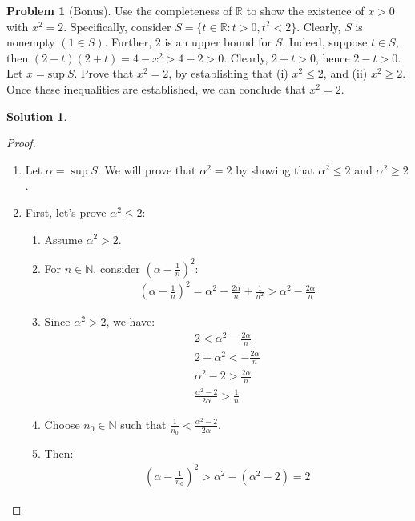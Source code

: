 \documentclass[12pt]{article}
\theoremstyle{definition} %
\newtheorem{solution}{Solution}
\newtheorem{problem}{Problem}
\theoremstyle{plain} %
\begin{document}
  \begin{problem}[Bonus]
      Use the completeness of $\mathbb{R}$ to show the existence of $x>0$ with $x^2=2$. Specifically, consider $S=\{t\in \mathbb{R} : t>0, t^2<2\}$. Clearly, $S$ is nonempty $(1\in S)$. Further, $2$ is an upper bound for $S$. Indeed, suppose $t\in S$, then $(2-t)(2+t)=4-x^2>4-2>0$. Clearly, $2+t>0$, hence $2-t>0$. 
  Let $x=\text{sup} \ S$. Prove that $x^2=2$, by establishing that (i) $x^2\leq 2$, and (ii) $x^2\geq 2$. Once these inequalities are established, we can conclude that $x^2=2$.
  
  \end{problem}
  \begin{solution}
      \begin{proof}
          \begin{enumerate}
              \item Let $\alpha = \sup S$. We will prove that $\alpha^2 = 2$ by showing that $\alpha^2 \leq 2$ and $\alpha^2 \geq 2$.
              \item First, let's prove $\alpha^2 \leq 2$:
              \begin{enumerate}
                  \item Assume $\alpha^2 > 2$.
                  \item For $n \in \mathbb{N}$, consider $(\alpha - \frac{1}{n})^2$:
                  \begin{align}
                  \left( \alpha-\frac{1}{n} \right)^2=\alpha^2-\frac{2\alpha}{n}+\frac{1}{n^2}>\alpha^2-\frac{2\alpha}{n}
                  \end{align}
                  \item Since $\alpha^2 > 2$, we have:
                  \begin{align}
                  2<\alpha^2-\frac{2\alpha}{n} \\
                  2-\alpha^2<-\frac{2\alpha}{n} \\
                  \alpha^2-2> \frac{2\alpha}{n} \\
                  \frac{\alpha^2-2}{2\alpha}> \frac{1}{n}
                  \end{align}
                  \item Choose $n_0 \in \mathbb{N}$ such that $\frac{1}{n_0} < \frac{\alpha^2-2}{2\alpha}$.
                  \item Then:
                  \begin{align}
                  \left( \alpha-\frac{1}{n_0} \right)^2>\alpha^2-(\alpha^2-2)=2

\end{align}
\end{enumerate}
\end{enumerate}
\end{proof}
\end{solution}
\end{document}
